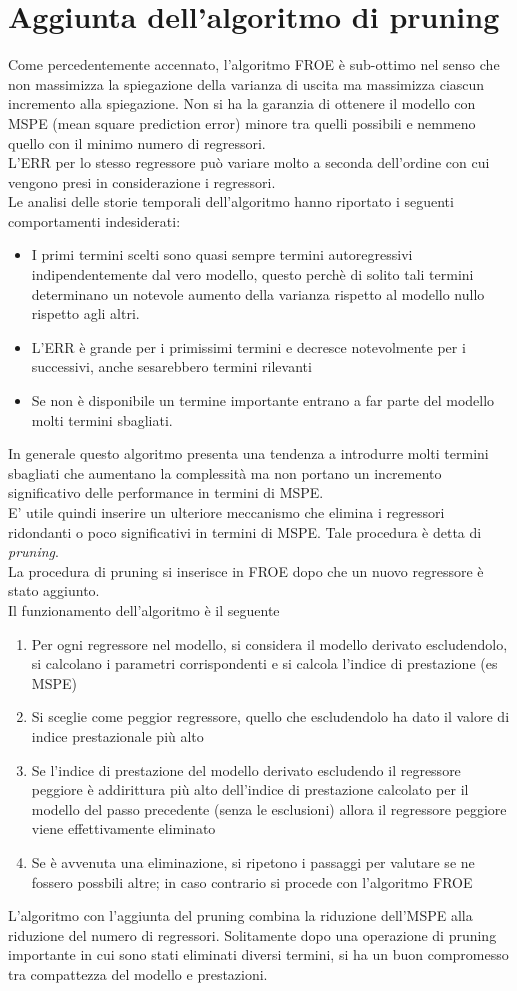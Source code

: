 \section{Aggiunta dell'algoritmo di pruning}
Come percedentemente accennato, l'algoritmo FROE è sub-ottimo nel senso che non massimizza la spiegazione della varianza di uscita ma massimizza ciascun incremento alla spiegazione. Non si ha la garanzia di ottenere il modello con MSPE (mean square prediction error) minore tra quelli possibili e nemmeno quello con il minimo numero di regressori.\\
L'ERR per lo stesso regressore può variare molto a seconda dell'ordine con cui vengono presi in considerazione i regressori.\\
Le analisi delle storie temporali dell'algoritmo hanno riportato i seguenti comportamenti indesiderati:
\begin{itemize}
\item I primi termini scelti sono quasi sempre termini autoregressivi indipendentemente dal vero modello, questo perchè di solito tali termini determinano un notevole aumento della varianza rispetto al modello nullo rispetto agli altri.
\item L'ERR è grande per i primissimi termini e decresce notevolmente per i successivi, anche sesarebbero termini rilevanti
\item Se non è disponibile un termine  importante entrano a far parte del modello molti termini sbagliati.
\end{itemize}
In generale questo algoritmo presenta una tendenza a introdurre molti termini sbagliati che aumentano la complessità ma non portano un incremento significativo delle performance in termini di MSPE.\\
E' utile quindi inserire un ulteriore meccanismo che elimina i regressori ridondanti o poco significativi in termini di MSPE. Tale procedura è detta di \emph{pruning}.\\
La procedura di pruning si inserisce in FROE dopo che un nuovo regressore è stato aggiunto.\\
Il funzionamento dell'algoritmo è il seguente
\begin{enumerate}
\item Per ogni regressore nel modello, si considera il modello derivato escludendolo, si calcolano i parametri corrispondenti e si calcola l'indice di prestazione (es MSPE)
\item Si sceglie come peggior regressore, quello che escludendolo ha dato il valore di indice prestazionale più alto
\item Se l'indice di prestazione del modello derivato escludendo il regressore peggiore è addirittura più alto dell'indice di prestazione calcolato per il modello del passo precedente (senza le esclusioni) allora il regressore peggiore viene effettivamente eliminato
\item Se è avvenuta una eliminazione, si ripetono i passaggi per valutare se ne fossero possbili altre; in caso contrario si procede con l'algoritmo FROE
\end{enumerate}
L'algoritmo con l'aggiunta del pruning combina la riduzione dell'MSPE alla riduzione del numero di regressori.
Solitamente dopo una operazione di pruning importante in cui sono stati eliminati diversi termini, si ha un buon compromesso tra compattezza del modello e prestazioni.
